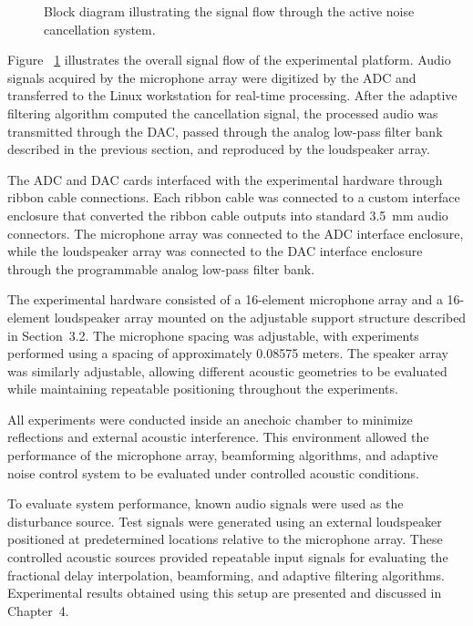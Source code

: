 \begin{figure}[H]
  \centering
    \resizebox{0.8\textwidth}{!}{  }
    \caption{Block diagram illustrating the signal flow through the active noise cancellation system.}
    \label{fig:sys_block_diagram}
\end{figure}

Figure ~\ref{fig:sys_block_diagram} illustrates the overall signal flow of the experimental platform. Audio signals acquired by the microphone array were digitized by the ADC and transferred to the Linux workstation for real-time processing. After the adaptive filtering algorithm computed the cancellation signal, the processed audio was transmitted through the DAC, passed through the analog low-pass filter bank described in the previous section, and reproduced by the loudspeaker array.

The ADC and DAC cards interfaced with the experimental hardware through ribbon cable connections. Each ribbon cable was connected to a custom interface enclosure that converted the ribbon cable outputs into standard 3.5~mm audio connectors. The microphone array was connected to the ADC interface enclosure, while the loudspeaker array was connected to the DAC interface enclosure through the programmable analog low-pass filter bank.

The experimental hardware consisted of a 16-element microphone array and a 16-element loudspeaker array mounted on the adjustable support structure described in Section~3.2. The microphone spacing was adjustable, with experiments performed using a spacing of approximately 0.08575 meters. The speaker array was similarly adjustable, allowing different acoustic geometries to be evaluated while maintaining repeatable positioning throughout the experiments.

All experiments were conducted inside an anechoic chamber to minimize reflections and external acoustic interference. This environment allowed the performance of the microphone array, beamforming algorithms, and adaptive noise control system to be evaluated under controlled acoustic conditions.

To evaluate system performance, known audio signals were used as the disturbance source. Test signals were generated using an external loudspeaker positioned at predetermined locations relative to the microphone array. These controlled acoustic sources provided repeatable input signals for evaluating the fractional delay interpolation, beamforming, and adaptive filtering algorithms. Experimental results obtained using this setup are presented and discussed in Chapter~4.

